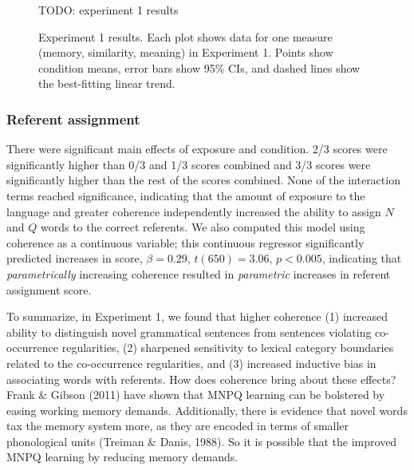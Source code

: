 \documentclass[man,floatsintext]{apa6}
\begin{document}
\begin{figure}[t]
\label{expt1-results}
\caption{Experiment 1 results. Each plot shows data for one measure (memory, similarity, meaning) in Experiment 1. Points show condition means, error bars show 95\% CIs, and dashed lines show the best-fitting linear trend.}
\begin{center}
TODO: experiment 1 results
\end{center}
\end{figure}

\subsubsection{Referent assignment} There were significant main effects of exposure and condition. 2/3 scores were significantly higher than 0/3 and 1/3 scores combined and 3/3 scores were significantly higher than the rest of the scores combined. None of the interaction terms reached significance, indicating that the amount of exposure to the language and greater coherence independently increased the ability to assign $N$ and $Q$ words to the correct referents. We also computed this model using coherence as a continuous variable; this continuous regressor significantly predicted increases in score, $\beta = 0.29$, $t(650) = 3.06$, $p < 0.005$, indicating that \emph{parametrically} increasing coherence resulted in \emph{parametric} increases in referent assignment score.

To summarize, in Experiment 1, we found that higher coherence (1) increased ability to distinguish novel grammatical sentences from sentences violating co-occurrence regularities, (2) sharpened sensitivity to lexical category boundaries related to the co-occurrence regularities, and (3) increased inductive bias in associating words with referents.
How does coherence bring about these effects? Frank \& Gibson (2011) have shown that MNPQ learning can be bolstered by easing working memory demands. Additionally, there is evidence that novel words tax the memory system more, as they are encoded in terms of smaller phonological units (Treiman \& Danis, 1988). So it is possible that the improved MNPQ learning by reducing memory demands. 
\end{document}
